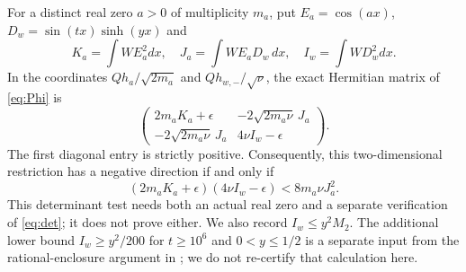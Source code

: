 \documentclass[11pt,a4paper]{article}
\begin{document}
For a distinct real zero $a>0$ of multiplicity $m_a$, put $E_a=\cos(ax)$, $D_w=\sin(tx)\sinh(yx)$ and
\[
 K_a=\int W E_a^2dx,\quad J_a=\int W E_aD_w\,dx,\quad I_w=\int W D_w^2dx.
\]
In the coordinates $Qh_a/\sqrt{2m_a}$ and $Qh_{w,-}/\sqrt\nu$, the exact Hermitian matrix of \eqref{eq:Phi} is
\begin{equation}\label{eq:matrix}
 \begin{pmatrix}2m_aK_a+\epsilon&-2\sqrt{2m_a\nu}\,J_a\\-2\sqrt{2m_a\nu}\,J_a&4\nu I_w-\epsilon\end{pmatrix}.
\end{equation}
The first diagonal entry is strictly positive. Consequently, this two-dimensional restriction has a negative direction if and only if
\begin{equation}\label{eq:det}
 (2m_aK_a+\epsilon)(4\nu I_w-\epsilon)<8m_a\nu J_a^2.
\end{equation}
This determinant test needs both an actual real zero and a separate verification of \eqref{eq:det}; it does not prove either. We also record $I_w\le y^2M_2$. The additional lower bound $I_w\ge y^2/200$ for $t\ge10^6$ and $0<y\le1/2$ is a separate input from the rational-enclosure argument in \cite{scalar}; we do not re-certify that calculation here.
\end{document}
